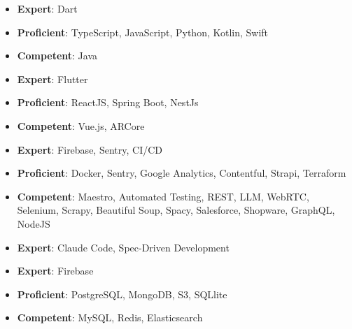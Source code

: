 









{
\quad
\begin{itemize}
\item  \textbf{Expert}: Dart
\item  \textbf{Proficient}: TypeScript, JavaScript, Python, Kotlin, Swift
\item  \textbf{Competent}: Java
\end{itemize}
}

\vspace{1em}

{
\quad
\begin{itemize}
\item  \textbf{Expert}: Flutter
\item  \textbf{Proficient}: ReactJS, Spring Boot, NestJs
\item  \textbf{Competent}: Vue.js, ARCore
\end{itemize}
}

\vspace{1em}

{
\quad
\begin{itemize}
\item  \textbf{Expert}: Firebase, Sentry, CI/CD
\item  \textbf{Proficient}: Docker, Sentry, Google Analytics, Contentful, Strapi, Terraform
\item  \textbf{Competent}: Maestro, Automated Testing, REST, LLM, WebRTC, Selenium, Scrapy, Beautiful Soup, Spacy, Salesforce, Shopware, GraphQL, NodeJS
\end{itemize}
}

\vspace{1em}

{
\quad
\begin{itemize}
\item  \textbf{Expert}: Claude Code, Spec-Driven Development
\end{itemize}
}

\vspace{1em}

{
\quad
\begin{itemize}
\item  \textbf{Expert}: Firebase
\item  \textbf{Proficient}: PostgreSQL, MongoDB, S3, SQLlite
\item  \textbf{Competent}: MySQL, Redis, Elasticsearch
\end{itemize}
}




